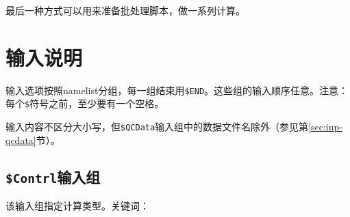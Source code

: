 \documentclass[12pt,a4paper,openany,twoside,cap]{ctexbook}
\begin{document}
最后一种方式可以用来准备批处理脚本，做一系列计算。


\chapter{输入说明} \label{part:input}

输入选项按照namelist分组，每一组结束用\verb|$END|。这些组的输入顺序任意。注意：每个\verb|$|符号之前，至少要有一个空格。

输入内容不区分大小写，但\verb|$QCData|输入组中的数据文件名除外（参见第\ref{sec:inp-qcdata}节）。

\section{\texttt{\$Contrl}输入组} \label{sec:inp-contrl}

该输入组指定计算类型。关键词：
\end{document}
